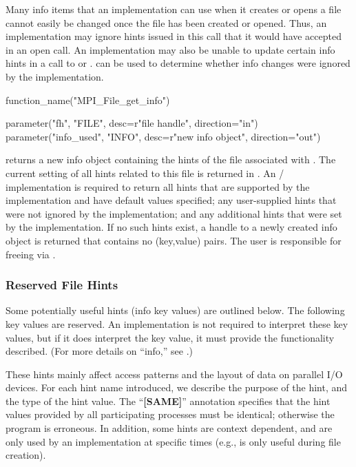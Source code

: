 \begin{users}
Many info items that an implementation can use when it
creates or opens a file cannot easily be changed
once the file has been created or opened.
Thus, an implementation may
ignore hints issued in this call that it would have
accepted in an open call.
An implementation may also be unable to update certain info hints in a call to
 or .
 can be used to determine whether info
changes were ignored by the implementation.
\end{users}

%
%
\begin{mpi-binding}
    function_name("MPI_File_get_info")
    
    parameter("fh", "FILE", desc=r"file handle", direction="in")
    parameter("info_used", "INFO", desc=r"new info object", direction="out")
\end{mpi-binding}

 returns a new info object containing
the hints of the file associated with .
The current setting of all hints related to this file is returned in
.  An \MPI/ implementation is required to return all hints
that are supported by the implementation and have default values
specified; any user-supplied hints that were not ignored by the
implementation; and any additional hints that were set by the
implementation.
If no such hints exist, 
a handle to a newly created info object is returned that
contains no (key,value) pairs. 
The user is responsible for freeing 
via .

\subsubsection{Reserved File Hints}

Some potentially useful hints (info key values) are outlined below.
The following key values are reserved.
An implementation is not required to interpret these key values,
but if it does interpret the key value,
it must provide the functionality described.
(For more details on ``info,'' see .)

These hints mainly affect access patterns
and the layout of data on parallel I/O devices.
For each hint name introduced, we
describe the purpose of the hint, and the type of the hint value.
The ``\textbf{[SAME]}'' annotation specifies that the hint values
provided by all participating processes must be identical;
otherwise the program is erroneous.
In addition, some hints are context dependent,
and are only used by an implementation at specific times
(e.g.,  is only useful during file creation).

